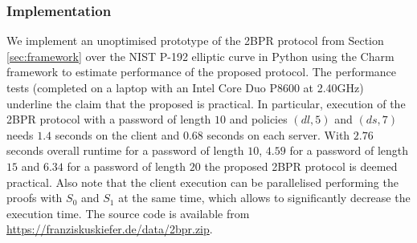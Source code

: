 \subsubsection{Implementation}
We implement an unoptimised prototype of the 2BPR protocol from Section \ref{sec:framework} over the NIST P-192 elliptic curve \cite{nist} in Python using the Charm framework \cite{charm13} to estimate performance of the proposed protocol.
The performance tests (completed on a laptop with an Intel Core Duo P8600 at 2.40GHz) underline the claim that the proposed is practical.
In particular, execution of the 2BPR protocol with a password of length $10$ and policies $(dl, 5)$ and $(ds, 7)$ needs $1.4$ seconds on the client and $0.68$ seconds on each server.
With $2.76$ seconds overall runtime for a password of length $10$, $4.59$ for a password of length $15$ and $6.34$ for a password of length $20$ the proposed 2BPR protocol is deemed practical.
Also note that the client execution can be parallelised performing the proofs with $S_0$ and $S_1$ at the same time, which allows to significantly decrease the execution time.
The source code is available from \url{https://franziskuskiefer.de/data/2bpr.zip}.

